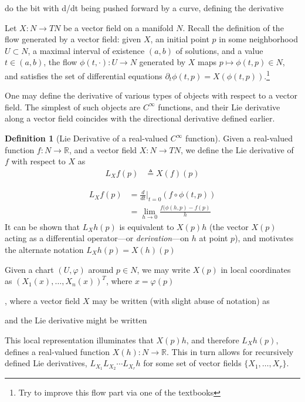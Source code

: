 \documentclass[psamsfonts]{amsart}
\theoremstyle{definition}
\newtheorem{defn}[thm]{Definition}
\theoremstyle{remark}
\newcommand*\R{\mathds{R}}
\numberwithin{equation}{section}
\begin{document}
{\color{red}do the bit with d/dt being pushed forward by a curve, defining the derivative






Let $X: N \rightarrow TN$ be a vector field on a manifold $N$. Recall the definition of the flow
generated by a vector field: given $X$, an initial point $p$ in some neighborhood $U\subset N$, a maximal interval of existence $(a, b)$ of solutions, and a value $t\in (a,b)$, the flow $\phi(t, \cdot): U \rightarrow N$ generated by $X$ maps $p \mapsto \phi(t, p)\in N$, and satisfies the set of differential equations $\partial_t\phi(t, p) = X(\phi(t, p))$.\footnote{{\color{red} Try to improve this flow part via one of the textbooks}}

One may define the derivative of various types of objects with respect to a vector field. The simplest of such objects are $C^{\infty}$ functions, and their Lie derivative along a vector field coincides with the directional derivative defined earlier. 

\begin{defn}[Lie Derivative of a real-valued $C^{\infty}$ function]
Given a real-valued function $f: N \rightarrow \R$, and a vector field $X: N\rightarrow TN$, we define the Lie derivative of $f$ with respect to $X$ as
\begin{align}
L_Xf(p) &\triangleq {} X(f)(p) 
\end{align}
\end{defn}

\begin{equation}
\begin{aligned}
L_Xf(p) &={}\frac{d}{dt}\biggr|_{t=0}\left( f \circ \phi(t, p)  \right)\\
&={} \lim_{h\rightarrow 0}\frac{f(\phi(h, p)-f(p)}{h}
\end{aligned}
\end{equation}
It can be shown that $L_Xh(p)$ is equivalent to $X(p)h$ (the vector $X(p)$ acting as a differential operator---or \textit{derivation}---on $h$ at point $p$), and motivates the alternate notation $L_Xh(p) = X(h)(p)$

Given a chart $(U, \varphi)$ around $p\in N$, we may write $X(p)$ in local coordinates as $(X_1(x), \dots, X_n(x))^T$, where $x = \varphi(p)$



, where a vector field $X$ may be written (with slight abuse of notation) as

 and the Lie derivative might be written 


This local representation illuminates that $X(p)h$, and therefore $L_Xh(p)$, defines a real-valued function $X(h):N\rightarrow \R$. This in turn allows for recursively defined Lie derivatives, $L_{X_{1}}L_{X_{2}}\cdots L_{X_{r}}h$ for some set of vector fields $\{X_1, \dots , X_r\}$.


}
\end{document}
